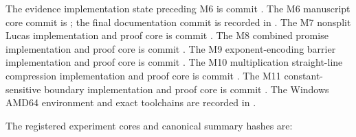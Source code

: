 \documentclass[11pt]{article}
\begin{document}
The evidence implementation state preceding M6 is commit
\texttt{}. The M6 manuscript core
commit is \texttt{}; the final documentation commit is recorded
in . The M7 nonsplit Lucas implementation and proof
core is commit
\texttt{}. The M8 combined
promise implementation and proof core is commit
\texttt{}. The M9
exponent-encoding barrier implementation and proof core is commit
\texttt{}. The M10
multiplication straight-line compression implementation and proof core is
commit
\texttt{}. The M11
constant-sensitive boundary implementation and proof core is commit
\texttt{}. The Windows
AMD64 environment and exact toolchains are recorded in
.

The registered experiment cores and canonical summary hashes are:
\end{document}
